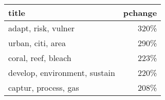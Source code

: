 \begin{tabular}{p{1.2cm}r}
\toprule
                         title &  pchange \\
\midrule
           adapt, risk, vulner &     320\% \\
             urban, citi, area &     290\% \\
           coral, reef, bleach &     223\% \\
 develop, environment, sustain &     220\% \\
          captur, process, gas &     208\% \\
\bottomrule
\end{tabular}
